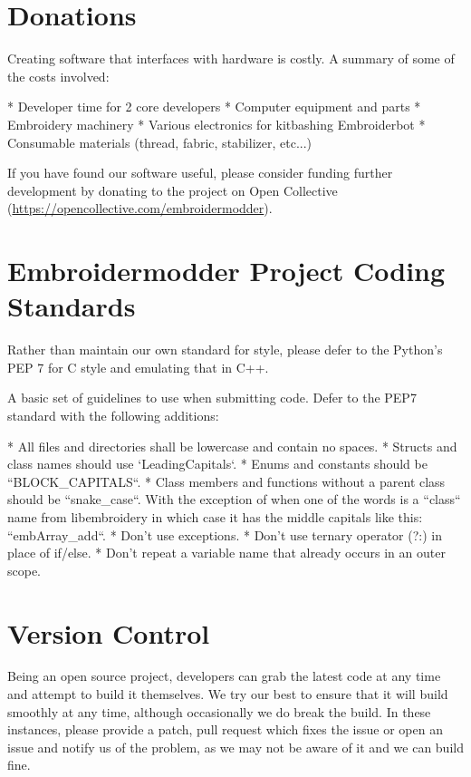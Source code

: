 \documentclass[11pt]{report}
\begin{document}
\section{Donations}

Creating software that interfaces with hardware is costly. A summary of some of the costs involved:

* Developer time for 2 core developers
* Computer equipment and parts
* Embroidery machinery
* Various electronics for kitbashing Embroiderbot
* Consumable materials (thread, fabric, stabilizer, etc...)

If you have found our software useful, please consider funding further development by donating to the project on Open Collective
(\url{https://opencollective.com/embroidermodder}).

\section{Embroidermodder Project Coding Standards}

Rather than maintain our own standard for style, please defer to
the Python's PEP 7 %
for C style and emulating that in C++.

A basic set of guidelines to use when submitting code. Defer to the PEP7 standard with the following additions:

* All files and directories shall be lowercase and contain no spaces.
* Structs and class names should use `LeadingCapitals`.
* Enums and constants should be ``BLOCK\_CAPITALS``.
* Class members and functions without a parent class should be ``snake\_case``.
  With the exception of when one of the words is a ``class`` name from
  libembroidery in which case it has the middle capitals like this:
  ``embArray\_add``.
* Don't use exceptions.
* Don't use ternary operator (?:) in place of if/else.
* Don't repeat a variable name that already occurs in an outer scope.

\section{Version Control}

Being an open source project, developers can grab the latest code at any
time and attempt to build it themselves. We try our best to ensure that
it will build smoothly at any time, although occasionally we do break
the build. In these instances, please provide a patch, pull request
which fixes the issue or open an issue and notify us of the problem, as
we may not be aware of it and we can build fine.
\end{document}
